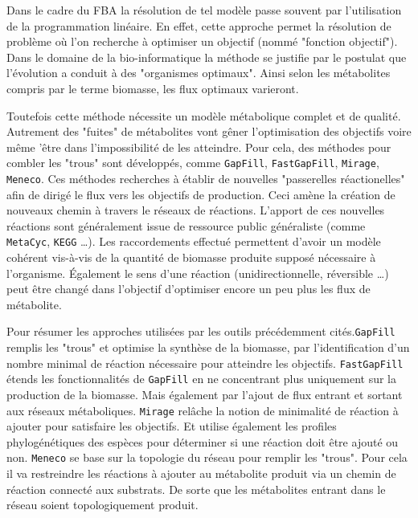\begin{refsegment}
    
    Dans le cadre du \gls{FBA} la résolution de tel modèle passe souvent par l'utilisation de la programmation linéaire. En effet, cette approche permet la résolution de problème où l'on recherche à optimiser un objectif (nommé "fonction objectif"). Dans le domaine de la bio-informatique la méthode se justifie par le postulat  que l’évolution a conduit à des "organismes optimaux". Ainsi selon les métabolites compris par le terme biomasse, les flux optimaux varieront.
    
    Toutefois cette méthode nécessite un modèle métabolique complet et de qualité. Autrement des "fuites" de métabolites vont gêner l'optimisation des objectifs voire même 'être dans l'impossibilité de les atteindre. Pour cela, des méthodes pour combler les "trous" sont développés, comme \texttt{GapFill}\cite{kumar2007optimization}, \texttt{FastGapFill}\cite{thiele2014fastgapfill}, \texttt{Mirage}\cite{vitkin2012mirage}, \texttt{Meneco}\cite{prigent2017meneco}. Ces méthodes recherches à établir de nouvelles "passerelles réactionelles" afin de dirigé le flux vers les objectifs de production. Ceci amène la création de nouveaux chemin à travers le réseaux de réactions. L'apport de ces nouvelles réactions sont généralement issue de ressource public généraliste (comme \texttt{MetaCyc}, \texttt{\gls{KEGG}} \ldots). Les raccordements effectué permettent d'avoir un modèle cohérent vis-à-vis de la quantité de biomasse produite supposé nécessaire à l'organisme. Également le sens d'une réaction (unidirectionnelle, réversible \ldots) peut être changé dans l'objectif d'optimiser encore un peu plus les flux de métabolite.
    
    Pour résumer les approches utilisées par les outils précédemment cités.\texttt{GapFill} remplis les "trous" et optimise la synthèse de la biomasse, par l'identification d'un nombre minimal de réaction nécessaire pour atteindre les objectifs. \texttt{FastGapFill} étends les fonctionnalités de \texttt{GapFill} en ne concentrant plus uniquement sur la production de la biomasse. Mais également par l'ajout de flux entrant et sortant aux réseaux métaboliques. \texttt{Mirage} relâche la notion de minimalité de réaction à ajouter pour satisfaire les objectifs. Et utilise également les profiles phylogénétiques des espèces pour déterminer si une réaction doit être ajouté ou non. \texttt{Meneco} se base sur la topologie du réseau pour remplir les "trous". Pour cela il va restreindre les réactions à ajouter au métabolite produit via un chemin de réaction connecté aux substrats. De sorte que les métabolites entrant dans le réseau soient topologiquement produit.
    

\end{refsegment}

